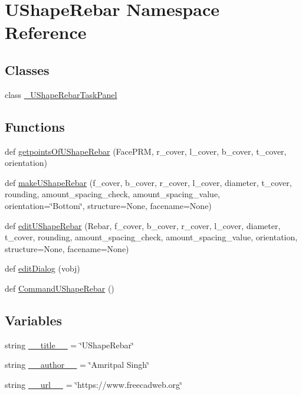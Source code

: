 \hypertarget{namespaceUShapeRebar}{}\section{U\+Shape\+Rebar Namespace Reference}
\label{namespaceUShapeRebar}
\subsection*{Classes}
\begin{DoxyCompactItemize}
\item 
class \hyperlink{classUShapeRebar_1_1__UShapeRebarTaskPanel}{\+\_\+\+U\+Shape\+Rebar\+Task\+Panel}
\end{DoxyCompactItemize}
\subsection*{Functions}
\begin{DoxyCompactItemize}
\item 
def \hyperlink{namespaceUShapeRebar_ac12ae9bce6b5211759f2fff4091b0221}{getpoints\+Of\+U\+Shape\+Rebar} (Face\+P\+RM, r\+\_\+cover, l\+\_\+cover, b\+\_\+cover, t\+\_\+cover, orientation)
\item 
def \hyperlink{namespaceUShapeRebar_adb9f6e4b9ec41d7a1fdfe58ad174fec3}{make\+U\+Shape\+Rebar} (f\+\_\+cover, b\+\_\+cover, r\+\_\+cover, l\+\_\+cover, diameter, t\+\_\+cover, rounding, amount\+\_\+spacing\+\_\+check, amount\+\_\+spacing\+\_\+value, orientation=\char`\"{}Bottom\char`\"{}, structure=None, facename=None)
\item 
def \hyperlink{namespaceUShapeRebar_a461f60869fd97a93fc015af4828467ee}{edit\+U\+Shape\+Rebar} (Rebar, f\+\_\+cover, b\+\_\+cover, r\+\_\+cover, l\+\_\+cover, diameter, t\+\_\+cover, rounding, amount\+\_\+spacing\+\_\+check, amount\+\_\+spacing\+\_\+value, orientation, structure=None, facename=None)
\item 
def \hyperlink{namespaceUShapeRebar_a16038a29bc4b605b909e4946d2e022ff}{edit\+Dialog} (vobj)
\item 
def \hyperlink{namespaceUShapeRebar_abd24828525ea7ad774fdff3df325a173}{Command\+U\+Shape\+Rebar} ()
\end{DoxyCompactItemize}
\subsection*{Variables}
\begin{DoxyCompactItemize}
\item 
string \hyperlink{namespaceUShapeRebar_ada77465e981ba03265231173a2645e0b}{\+\_\+\+\_\+title\+\_\+\+\_\+} = \char`\"{}U\+Shape\+Rebar\char`\"{}
\item 
string \hyperlink{namespaceUShapeRebar_a97e2ec9c8f01fe19bd22095b5aef9c29}{\+\_\+\+\_\+author\+\_\+\+\_\+} = \char`\"{}Amritpal Singh\char`\"{}
\item 
string \hyperlink{namespaceUShapeRebar_a7684dab24892bce1b6ca80c35d20f159}{\+\_\+\+\_\+url\+\_\+\+\_\+} = \char`\"{}https\+://www.\+freecadweb.\+org\char`\"{}
\end{DoxyCompactItemize}



